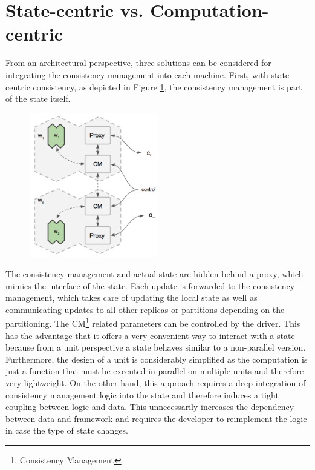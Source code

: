 \section{State-centric vs. Computation-centric}
From an architectural perspective, three solutions can be considered for integrating the consistency management into each machine.
First, with state-centric consistency, as depicted in Figure \ref{fig:state_centric_consistency}, the consistency management is part of the state itself.
\begin{figure}[ht]
\centering
\includegraphics[width=0.5\textwidth]{img/state_centric_consist.png}
\caption{}
\label{fig:state_centric_consistency}
\end{figure}
The consistency management and actual state are hidden behind a proxy, which mimics the interface of the state.
Each update is forwarded to the consistency management, which takes care of updating the local state as well as communicating updates to all other replicas or partitions depending on the partitioning.
The CM\footnote{Consistency Management} related parameters can be controlled by the driver.
This has the advantage that it offers a very convenient way to interact with a state because from a unit perspective a state behaves similar to a non-parallel version.
Furthermore, the design of a unit is considerably simplified as the computation is just a function that must be executed in parallel on multiple units and therefore very lightweight.
On the other hand, this approach requires a deep integration of consistency management logic into the state and therefore induces a tight coupling between logic and data.
This unnecessarily increases the dependency between data and framework and requires the developer to reimplement the logic in case the type of state changes.

